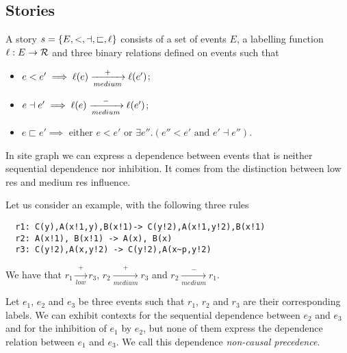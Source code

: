 \subsection{Stories}

\begin{definition}
  A story $s=\{E,<,\dashv,\sqsubset,\ell\}$ consists of a set of events $E$, a labelling function $\ell:E\to\mathcal{R}$ and three binary relations defined on events such that
  \begin{itemize}
  \item $e<e'\implies\ell(e)\xrightarrow[medium]{+} \ell(e')$;
  \item $e\dashv e'\implies\ell(e)\xrightarrow[medium]{-} \ell(e')$;
  \item $e\sqsubset e'\implies\text{ either }e<e'\text{ or }\exists e''. (e''<e'\text{ and }e'\dashv e'')$.
  \end{itemize}
\end{definition}

\begin{example}
In site graph we can express a dependence between events that is neither sequential dependence nor inhibition. It comes from the distinction between low res and medium res influence.

Let us consider an example, with the following three rules

\begin{verbatim}
  r1: C(y),A(x!1,y),B(x!1)-> C(y!2),A(x!1,y!2),B(x!1)
  r2: A(x!1), B(x!1) -> A(x), B(x)
  r3: C(y!2),A(x,y!2) -> C(y!2),A(x~p,y!2)
\end{verbatim}

We have that $r_1\xrightarrow[low]{+} r_3$, $r_2\xrightarrow[medium]{+} r_3$ and $r_2\xrightarrow[medium]{-} r_1$.

Let $e_1$, $e_2$ and $e_3$ be three events such that $r_1$, $r_2$ and $r_3$ are their corresponding labels. We can exhibit contexts for the sequential dependence between $e_2$ and $e_3$ and for the inhibition of $e_1$ by $e_2$, but none of them express the dependence relation between $e_1$ and $e_3$. We call this dependence \emph{non-causal precedence}.
\end{example}


